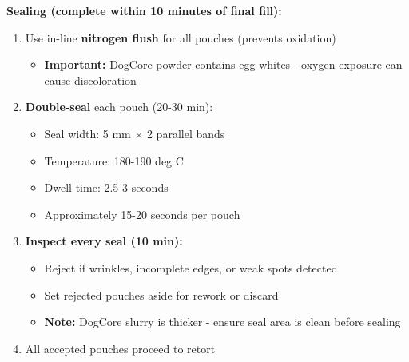 \vspace{0.5em}
\textbf{Sealing (complete within 10 minutes of final fill):}
\begin{enumerate}[leftmargin=1.5em]
\item Use in-line \textbf{nitrogen flush} for all pouches (prevents oxidation)
  \begin{itemize}
  \item \textbf{Important:} DogCore powder contains egg whites - oxygen exposure can cause discoloration
  \end{itemize}
\item \textbf{Double-seal} each pouch (20-30 min):
  \begin{itemize}
  \item Seal width: 5 mm $\times$ 2 parallel bands
  \item Temperature: 180-190 deg C
  \item Dwell time: 2.5-3 seconds
  \item Approximately 15-20 seconds per pouch
  \end{itemize}
\item \textbf{Inspect every seal (10 min):}
  \begin{itemize}
  \item Reject if wrinkles, incomplete edges, or weak spots detected
  \item Set rejected pouches aside for rework or discard
  \item \textbf{Note:} DogCore slurry is thicker - ensure seal area is clean before sealing
  \end{itemize}
\item All accepted pouches proceed to retort
\end{enumerate}

